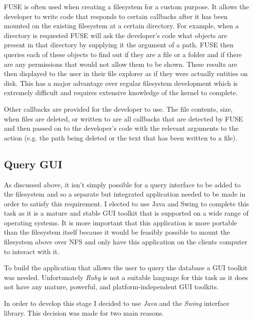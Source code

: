 \ac{FUSE} is often used when creating a filesystem for a custom purpose. It
allows the developer to write code that responds to certain callbacks after it
has been mounted on the existing filesystem at a certain directory. For
example, when a directory is requested \ac{FUSE} will ask the developer's code
what objects are present in that directory by supplying it the argument of
a path. \ac{FUSE} then queries each of these objects to find out if they are
a file or a folder and if there are any permissions that would not allow them
to be shown. These results are then displayed to the user in their file
explorer as if they were actually entities on disk. This has a major advantage
over regular filesystem development which is extremely difficult and requires
extensive knowledge of the kernel to complete.

Other callbacks are provided for the developer to use. The file contents, size,
when files are deleted, or written to are all callbacks that are detected by
\ac{FUSE} and then passed on to the developer's code with the relevant
arguments to the action (e.g. the path being deleted or the text that has been
written to a file).

\subsection{Query GUI}

As discussed above, it isn't simply possible for a query interface to be added
to the filesystem and so a separate but integrated application needed to be
made in order to satisfy this requirement. I elected to use Java and Swing to
complete this task as it is a mature and stable \ac{GUI} toolkit that is
supported on a wide range of operating systems. It is more important that this
application is more portable than the filesystem itself because it would be
feasibly possible to mount the filesystem above over \ac{NFS} and only have
this application on the clients computer to interact with it.

To build the application that allows the user to query the database a GUI
toolkit was needed. Unfortunately \emph{Ruby} is not a suitable language for
this task as it does not have any mature, powerful, and platform-independent
GUI toolkits.

In order to develop this stage I decided to use \emph{Java} and the
\emph{Swing} interface library. This decision was made for two main reasons.

